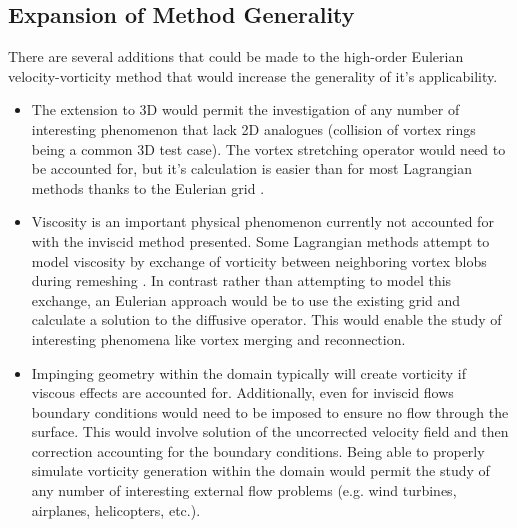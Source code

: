 \documentclass[letterpaper,12pt]{report}
\begin{document}
\subsection{Expansion of Method Generality}
There are several additions that could be made to the high-order Eulerian velocity-vorticity method that would increase the generality of it's applicability.
\begin{itemize}
\item The extension to 3D would permit the investigation of any number of interesting phenomenon that lack 2D analogues (collision of vortex rings \cite{Wee} being a common 3D test case). The vortex stretching operator would need to be accounted for, but it's calculation is easier than for most Lagrangian methods thanks to the Eulerian grid \cite{Saffman1992}.

\item Viscosity is an important physical phenomenon currently not accounted for with the inviscid method presented. Some Lagrangian methods attempt to model viscosity by exchange of vorticity between neighboring vortex blobs during remeshing \cite{HaldReview}. In contrast rather than attempting to model this exchange, an Eulerian approach would be to use the existing grid and calculate a solution to the diffusive operator. This would enable the study of interesting phenomena like vortex merging and reconnection.

\item Impinging geometry within the domain typically will create vorticity if viscous effects are accounted for. Additionally, even for inviscid flows boundary conditions would need to be imposed to ensure no flow through the surface. This would involve solution of the uncorrected velocity field and then correction accounting for the boundary conditions. Being able to properly simulate vorticity generation within the domain would permit the study of any number of interesting external flow problems (e.g. wind turbines, airplanes, helicopters, etc.).
\end{itemize}
\end{document}
